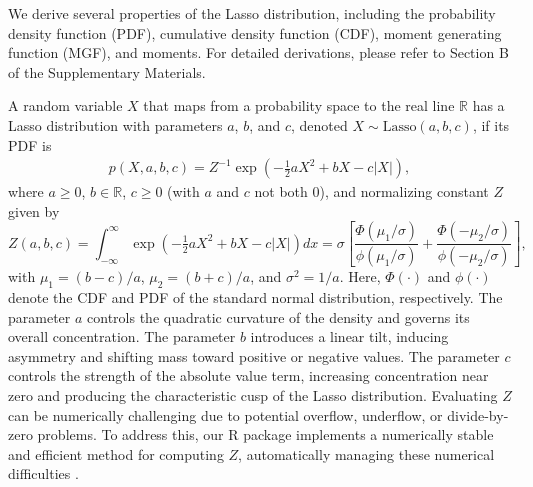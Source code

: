 We derive several properties of the Lasso distribution, including the probability density function (PDF), cumulative density function (CDF), moment generating function (MGF), and moments. For detailed derivations, please refer to Section B of the Supplementary Materials.



A random variable $X$ that maps from a probability space to the real line $\mathbb{R}$ has a Lasso distribution with parameters $a$, $b$, and $c$, denoted $X \sim \text{Lasso}(a,b,c)$, if its PDF is 
\begin{align*}
   p(X,a,b,c) = Z^{-1}\exp\left(-\tfrac{1}{2}aX^2+bX-c|X|\right),
\end{align*}
where $a \geq 0$, $b \in \mathbb{R}$, $c \geq 0$ (with $a$ and $c$ not both 0), and normalizing constant  $Z$   given by
$$Z(a,b,c) = \int_{-\infty}^\infty \exp\left( -\tfrac{1}{2}aX^2 + bX - c|X| \right) dx = \sigma \left[ \frac{\Phi(\mu_1/\sigma)}{\phi(\mu_1/\sigma)}
+ \frac{\Phi(-\mu_2/\sigma)}{\phi(-\mu_2/\sigma)}  \right],$$
with $\mu_1 = (b-c)/a$, $\mu_2 = (b + c)/a$, and $\sigma^{2} = 1/a$. Here, $\Phi(\cdot)$ and $\phi(\cdot)$ denote the CDF and PDF of the standard normal distribution, respectively. The parameter $a$ controls the quadratic curvature of the density and governs its overall concentration. The parameter $b$ introduces a linear tilt, inducing asymmetry and shifting mass toward positive or negative values. The parameter $c$ controls the strength of the absolute value term, increasing concentration near zero and producing the characteristic cusp of the Lasso distribution.
Evaluating $Z$ can be numerically challenging due to potential overflow, underflow, or divide-by-zero problems. To address this, our R package  implements a numerically stable and efficient method for computing $Z$, automatically managing these numerical difficulties \citep{BayesianLassoPkg}.



